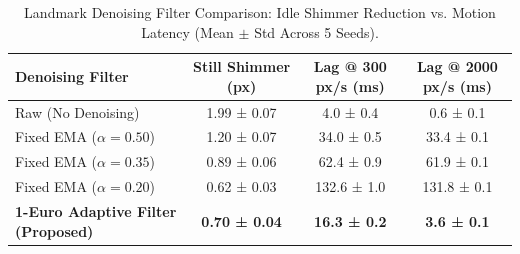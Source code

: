 \begin{table}[t]
\centering
\caption{Landmark Denoising Filter Comparison: Idle Shimmer Reduction vs. Motion Latency (Mean $\pm$ Std Across 5 Seeds).}
\label{tab:smoothing}
\begin{tabular}{lccc}
\toprule
\textbf{Denoising Filter} & \textbf{Still Shimmer (px)} & \textbf{Lag @ 300 px/s (ms)} & \textbf{Lag @ 2000 px/s (ms)} \\
\midrule
Raw (No Denoising) & 1.99 ± 0.07 & 4.0 ± 0.4 & 0.6 ± 0.1 \\
Fixed EMA ($\alpha = 0.50$) & 1.20 ± 0.07 & 34.0 ± 0.5 & 33.4 ± 0.1 \\
Fixed EMA ($\alpha = 0.35$) & 0.89 ± 0.06 & 62.4 ± 0.9 & 61.9 ± 0.1 \\
Fixed EMA ($\alpha = 0.20$) & 0.62 ± 0.03 & 132.6 ± 1.0 & 131.8 ± 0.1 \\
\textbf{1-Euro Adaptive Filter (Proposed)} & \textbf{0.70 ± 0.04} & \textbf{16.3 ± 0.2} & \textbf{3.6 ± 0.1} \\
\bottomrule
\end{tabular}
\end{table}
